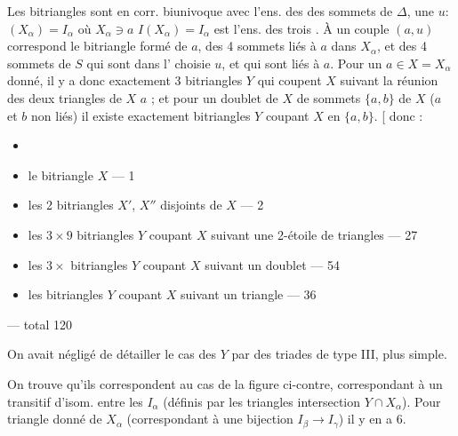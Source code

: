 \documentclass[11pt,a4paper]{article}
\begin{document}
Les bitriangles sont en corr. biunivoque avec l'ens. des  \struck{\ill{}} des sommets de $\Delta$, une \struck{\ill{} \ill{} \ill{}} \struck{\ill{} \ill{} \ill{}}  $u :$ \struck{$\Pi$}$(X_\alpha) = I_\alpha$
où $X_\alpha \ni a$  $I(X_\alpha) = I_\alpha$ est l'ens. des trois  . À un couple $(a,u)$ correspond le bitriangle formé de $a$, des 4 sommets \ill{} liés à $a$ dans $X_\alpha$, et des 4 sommets de $S$ qui sont dans l' choisie $u$, et qui sont  liés à $a$. Pour un $a \in X = X_\alpha$ donné, il y a donc exactement 3 bitriangles $Y$ qui coupent $X$ suivant la réunion des deux triangles de $X$  $a$ ; et pour un doublet de $X$ de sommets $\{a,b\}$ de $X$ ($a$ et $b$ non liés) il existe exactement \struck{\ill{}}  bitriangles $Y$ coupant $X$ en $\{a,b\}$. [ donc :

\begin{itemize}
  \item {}
  \item le bitriangle $X$ — 1
  \item les 2 bitriangles $X'$, $X''$ disjoints de $X$ — 2
  \item les $3 \times 9$ bitriangles $Y$ coupant $X$ suivant une 2-étoile de triangles — 27
  \item les $3 \times$   bitriangles $Y$ coupant $X$ suivant un doublet — 54
  \item les \struck{\ill{}}  bitriangles $Y$ coupant $X$ suivant un triangle — 36
\end{itemize}

 — total \struck{\ill{}} 120

On avait \struck{\ill{}} négligé de détailler le cas des $Y$  par des triades de type III, plus simple.

On trouve qu'ils correspondent au cas de \struck{\ill{}} la figure ci-contre, correspondant à un  transitif d'isom. entre les $I_\alpha$ (définis par les triangles intersection $Y \cap X_\alpha$). Pour  triangle donné de $X_\alpha$ (correspondant à une bijection $I_\beta \to I_\gamma$) il y en a 6.

\end{document}
